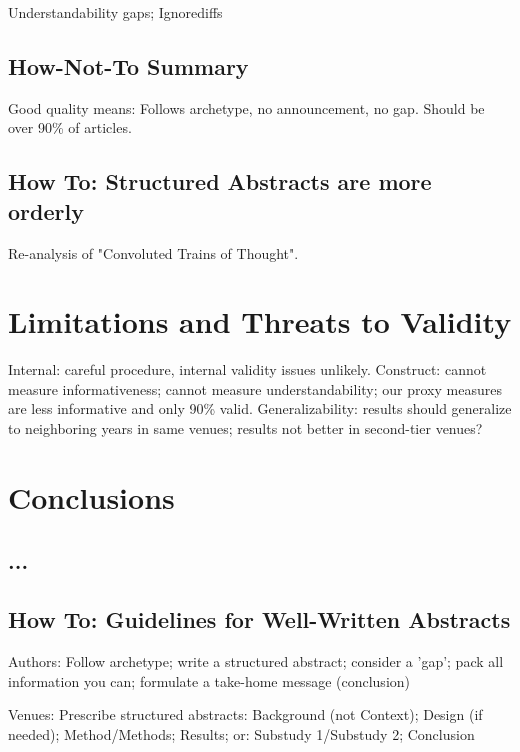 \documentclass[10pt,journal,compsoc]{IEEEtran}
\begin{document}
\noindent
Understandability gaps; Ignorediffs


\subsection{How-Not-To Summary}

\noindent
Good quality means: Follows archetype, no announcement, no gap.
Should be over 90\% of articles.


\subsection{How To: Structured Abstracts are more orderly}

\noindent
Re-analysis of "Convoluted Trains of Thought". 




\section{Limitations and Threats to Validity}

\noindent
Internal: careful procedure, internal validity issues unlikely.
Construct: cannot measure informativeness; cannot measure understandability;
our proxy measures are less informative and only 90\% valid.
Generalizability: 
results should generalize to neighboring years in same venues;
results not better in second-tier venues?


\section{Conclusions}


\subsection{...}
\noindent


\subsection{How To: Guidelines for Well-Written Abstracts}

\noindent
Authors: Follow archetype; write a structured abstract; consider a 'gap'; pack all information you can; formulate a take-home message (conclusion)

Venues: Prescribe structured abstracts: Background (not Context); Design (if needed); Method/Methods; Results; or: Substudy 1/Substudy 2; Conclusion
\end{document}
